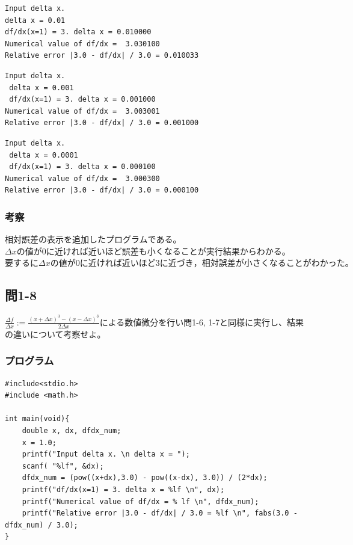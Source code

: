 \documentclass{jarticle}
\begin{document}
\begin{breakbox}
\begin{verbatim}
Input delta x. 
delta x = 0.01
df/dx(x=1) = 3. delta x = 0.010000 
Numerical value of df/dx =  3.030100 
Relative error |3.0 - df/dx| / 3.0 = 0.010033 
\end{verbatim}
\end{breakbox}

\begin{breakbox}
\begin{verbatim}
Input delta x. 
 delta x = 0.001 
 df/dx(x=1) = 3. delta x = 0.001000 
Numerical value of df/dx =  3.003001 
Relative error |3.0 - df/dx| / 3.0 = 0.001000 
\end{verbatim}
\end{breakbox}

\begin{breakbox}
\begin{verbatim}
Input delta x. 
 delta x = 0.0001 
 df/dx(x=1) = 3. delta x = 0.000100 
Numerical value of df/dx =  3.000300 
Relative error |3.0 - df/dx| / 3.0 = 0.000100 
\end{verbatim}
\end{breakbox}
\subsubsection{考察\\}
相対誤差の表示を追加したプログラムである。\\
$\Delta {x}の値が0に近ければ近いほど誤差も小くなることが実行結果からわかる。$\\
$要するに\Delta {x}の値が0に近ければ近いほど3に近づき，相対誤差が小さくなることがわかった。$\\

\subsection{問1-8\\}
\( \frac{\Delta f}{\Delta x} := \frac{(x+\Delta x)^3 - (x-\Delta x)^3}{2\Delta x} \)による数値微分を行い問1-6, 1-7と同様に実行し、結果の違いについて考察せよ。
\subsubsection{プログラム\\}
\begin{breakbox}
\begin{verbatim}
#include<stdio.h>
#include <math.h>

int main(void){
	double x, dx, dfdx_num;
	x = 1.0;
	printf("Input delta x. \n delta x = ");
	scanf( "%lf", &dx);
  	dfdx_num = (pow((x+dx),3.0) - pow((x-dx), 3.0)) / (2*dx);	
	printf("df/dx(x=1) = 3. delta x = %lf \n", dx);
	printf("Numerical value of df/dx = % lf \n", dfdx_num);
  	printf("Relative error |3.0 - df/dx| / 3.0 = %lf \n", fabs(3.0 - dfdx_num) / 3.0);
}
\end{verbatim}
\end{breakbox}
\end{document}
